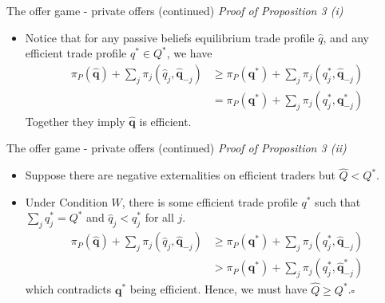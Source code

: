 \documentclass[aspectratio=169]{beamer}  %
\begin{document}
\begin{frame}{The offer game - private offers (continued)}
    \textit{Proof of Proposition 3 (i)} \vspace{.2cm}
    \begin{itemize}
        \item Notice that for any passive beliefs equilibrium trade profile $\hat{q}$, and any efficient trade profile $q^*\in Q^*$, we have
        \begin{equation}
            \begin{aligned}
                \pi_P(\hat{\mathbf{q}}) + \sum_j \pi_j(\hat{q}_j,\hat{\mathbf{q}}_{-j}) & \geq \pi_P(\mathbf{q}^*) + \sum_j \pi_j(q_j^*,\hat{\mathbf{q}}_{-j})\\
                & = \pi_P(\mathbf{q}^*) + \sum_j \pi_j(q_j^*, \mathbf{q}^*_{-j})
            \end{aligned}    
        \end{equation}
        Together they imply $\hat{\mathbf{q}}$ is efficient. \vspace{.2cm}
    \end{itemize}
\end{frame}



\begin{frame}{The offer game - private offers (continued)}
    \textit{Proof of Proposition 3 (ii)} \vspace{.2cm}
    \begin{itemize}
        \item Suppose there are negative externalities on efficient traders but $\hat{Q}<Q^*$. \vspace{.2cm}
        \item Under Condition $W$, there is some efficient trade profile $q^*$ such that $\sum_j q^*_j = Q^*$ and $\hat{q}_j<q_j^*$ for all $j$. \vspace{.2cm}
        \begin{equation*}
            \begin{aligned}
                \pi_P(\hat{\mathbf{q}}) + \sum_j \pi_j(\hat{q}_j, \hat{\mathbf{q}}_{-j}) & \geq \pi_P(\mathbf{q}^*) + \sum_j \pi_j(q_j^*, \hat{\mathbf{q}}_{-j})  \\
                & > \pi_P(\mathbf{q}^*) + \sum_j \pi_j(q_j^*, \hat{\mathbf{q}}^*_{-j})
            \end{aligned}
        \end{equation*}
        which contradicts $\mathbf{q}^*$ being efficient. Hence, we must have $\hat{Q}\geq Q^*$.\hfill$\square$
    \end{itemize}
\end{frame}
\end{document}
